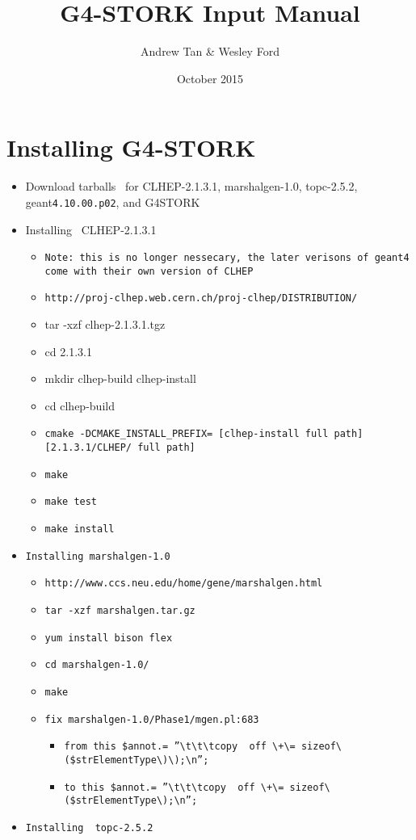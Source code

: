 \documentclass{article}
\title{G4-STORK Input Manual}
\author{Andrew Tan \& Wesley Ford}
\date{October 2015}
\begin{document}
\maketitle

\section{Installing G4-STORK}
\begin{itemize}
\item Download tarballs \ for CLHEP-2.1.3.1, marshalgen-1.0, topc-2.5.2, geant\texttt{4.10.00.p02}, and G4STORK
\item Installing \ CLHEP-2.1.3.1

\begin{itemize}
\item \texttt{Note: this is no longer nessecary, the later verisons of geant4 come with their own version of CLHEP}
\item \texttt{http://proj-clhep.web.cern.ch/proj-clhep/DISTRIBUTION/}
\item tar -xzf clhep-2.1.3.1.tgz
\item cd 2.1.3.1
\item mkdir clhep-build clhep-install
\item cd clhep-build
\item \texttt{cmake -DCMAKE\_INSTALL\_PREFIX= [clhep-install full path] [2.1.3.1/CLHEP/ full path]}
\item \texttt{make}
\item \texttt{make test}
\item \texttt{make install}
\end{itemize}
\item \texttt{Installing marshalgen-1.0}

\begin{itemize}
\item \texttt{http://www.ccs.neu.edu/home/gene/marshalgen.html}
\item \texttt{tar -xzf marshalgen.tar.gz}
\item \texttt{yum install bison flex}
\item \texttt{cd marshalgen-1.0/}
\item \texttt{make}
\item \texttt{fix  marshalgen-1.0/Phase1/mgen.pl:683}
\begin{itemize}
\item \begin{verbatim}
from this $annot.= ”\t\t\tcopy  off \+\= sizeof\($strElementType\)\);\n”;
\end{verbatim}
\item \begin{verbatim}
to this $annot.= ”\t\t\tcopy  off \+\= sizeof\($strElementType\);\n”;
\end{verbatim}
\end{itemize}
\end{itemize}
\item \texttt{Installing \ topc-2.5.2}


\end{itemize}
\end{document}
